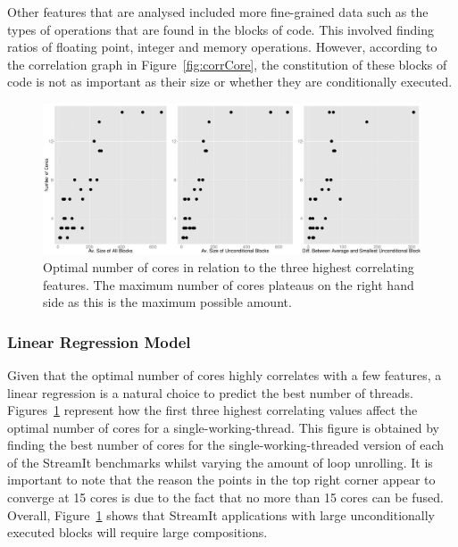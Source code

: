 Other features that are analysed included more fine-grained data such as the types of operations that are found in the blocks of code.
This involved finding ratios of floating point, integer and memory operations.
However, according to the correlation graph in Figure~\ref{fig:corrCore}, the constitution of these blocks of code is not as important as their size or whether they are conditionally executed.

\begin{figure}[t]
  \center
  \includegraphics[width=1\textwidth]{streamit-paper/graphics/lineargraphs.pdf}
  \caption{Optimal number of cores in relation to the three highest correlating features. The maximum number of cores plateaus on the right hand side as this is the maximum possible amount.}\label{fig:maxav}
\end{figure}

\subsubsection{Linear Regression Model}
Given that the optimal number of cores highly correlates with a few features, a linear regression is a natural choice to predict the best number of threads.
Figures~\ref{fig:maxav} represent how the first three highest correlating values affect the optimal number of cores for a single-working-thread.
This figure is obtained by finding the best number of cores for the single-working-threaded version of each of the StreamIt benchmarks whilst varying the amount of loop unrolling.
It is important to note that the reason the points in the top right corner appear to converge at 15 cores is due to the fact that no more than 15 cores can be fused.
Overall, Figure~\ref{fig:maxav} shows that StreamIt applications with large unconditionally executed blocks will require large compositions.


